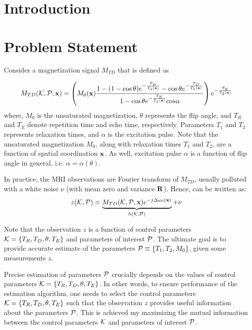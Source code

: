 \documentclass[]{article}
\begin{document}
\section*{Introduction}


\section*{Problem Statement}\label{sec:prob_statement}
Consider a magnetization signal $M_{TD}$ that is defined as

\begin{equation}\label{mtd}
M_{TD}(\mathcal{K},\mathcal{P},\mathbf{x})=\left(M_0(\mathbf{x})\frac{1-(1-\cos \theta)e^{-\frac{T_D}{T_1(\mathbf{x})}}-\cos \theta e^{-\frac{T_D}{T_1(\mathbf{x})}}}{1-\cos \theta e^{-\frac{T_R}{T_1(\mathbf{x})}}cos \alpha}\right) e^{-\frac{T_E}{T_2(\mathbf{x})}}
\end{equation}
where, $M_0$ is the unsaturated magnetization, $\theta$ represents the flip angle, and $T_R$ and $T_E$ denote repetition time and echo time, respectively. Parameters $T_1$ and $T_2$ represents relaxation times, and $\alpha$ is the excitation pulse. Note that the unsaturated magnetization $M_0$, along with relaxation times $T_1$ and $T_2$, are a function of spatial coordination $\mathbf{x}$. As well, excitation pulse $\alpha$ is a function of flip angle in general, i.e. $\alpha=\alpha(\theta)$.

In practice, the MRI observations are Fourier transform of $M_{TD}$, usually polluted with a white noise $\nu$ (with mean zero and variance $\mathbf{R}$). Hence,  can be written as:
\begin{equation}\label{mtdobs}
z(\mathcal{K},\mathcal{P})=\underbrace{M_{TD}(\mathcal{K},\mathcal{P},\mathbf{x})e^{-j\Delta\omega_0(\mathbf{x})}}_{h(\mathcal{K},\mathcal{P})}+\nu\textbf{}
\end{equation}

Note that the observation $z$ is a function of control parameters $\mathcal{K}=\{T_R,T_D,\theta,T_E\}$ and parameters of interest $\mathcal{P}$. %
The ultimate goal is to provide accurate estimate of the parameters $\mathcal{P}\equiv \{T_1,T_2,M_0\}$, given some measurements $z$. 

Precise estimation of parameters $\mathcal{P}$ crucially depends on the values of control parameters $\mathcal{K}=\{T_R,T_D,\theta,T_E\}$.  In other words, to ensure performance of the estimation algorithm, one needs to select the control parameters $\mathcal{K}=\{T_R,T_D,\theta,T_E\}$ such that the observation $z$ provides useful information about the parameters $\mathcal{P}$. This is achieved my maximizing the mutual information between the control parameters $\mathcal{K}$ and parameters of interest $\mathcal{P}$. 
\end{document}
